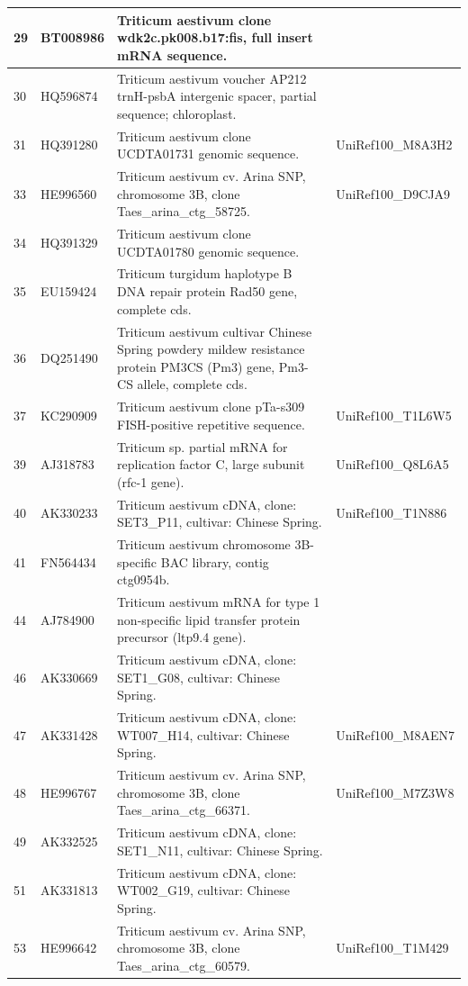 \documentclass[10.9pt]{article} %
\begin{document}
{\begin{longtable}{|p{1.5cm}|p{2cm}|p{9cm}|p{3cm}|}
\hline
29 & BT008986 & Triticum aestivum clone wdk2c.pk008.b17:fis, full insert mRNA sequence. & \\
\hline
30 & HQ596874 & Triticum aestivum voucher AP212 trnH-psbA intergenic spacer, partial sequence; chloroplast. & \\
\hline
31 & HQ391280 & Triticum aestivum clone UCDTA01731 genomic sequence. & UniRef100\_M8A3H2\\
\hline
33 & HE996560 & Triticum aestivum cv. Arina SNP, chromosome 3B, clone Taes\_arina\_ctg\_58725. & UniRef100\_D9CJA9\\
\hline
34 & HQ391329 & Triticum aestivum clone UCDTA01780 genomic sequence. & \\
\hline
35 & EU159424 & Triticum turgidum haplotype B DNA repair protein Rad50 gene, complete cds. & \\
\hline
36 & DQ251490 & Triticum aestivum cultivar Chinese Spring powdery mildew resistance protein PM3CS (Pm3) gene, Pm3-CS allele, complete cds. & \\
\hline
37 & KC290909 & Triticum aestivum clone pTa-s309 FISH-positive repetitive sequence. & UniRef100\_T1L6W5\\
\hline
39 & AJ318783 & Triticum sp. partial mRNA for replication factor C, large subunit (rfc-1 gene). & UniRef100\_Q8L6A5\\
\hline
40 & AK330233 & Triticum aestivum cDNA, clone: SET3\_P11, cultivar: Chinese Spring. & UniRef100\_T1N886\\
\hline
41 & FN564434 & Triticum aestivum chromosome 3B-specific BAC library, contig ctg0954b. & \\
\hline
44 & AJ784900 & Triticum aestivum mRNA for type 1 non-specific lipid transfer protein precursor (ltp9.4 gene). & \\
\hline
46 & AK330669 & Triticum aestivum cDNA, clone: SET1\_G08, cultivar: Chinese Spring. & \\
\hline
47 & AK331428 & Triticum aestivum cDNA, clone: WT007\_H14, cultivar: Chinese Spring. & UniRef100\_M8AEN7\\
\hline
48 & HE996767 & Triticum aestivum cv. Arina SNP, chromosome 3B, clone Taes\_arina\_ctg\_66371. & UniRef100\_M7Z3W8\\
\hline
49 & AK332525 & Triticum aestivum cDNA, clone: SET1\_N11, cultivar: Chinese Spring. & \\
\hline
51 & AK331813 & Triticum aestivum cDNA, clone: WT002\_G19, cultivar: Chinese Spring. & \\
\hline
53 & HE996642 & Triticum aestivum cv. Arina SNP, chromosome 3B, clone Taes\_arina\_ctg\_60579. & UniRef100\_T1M429\\

\end{longtable}}
\end{document}
